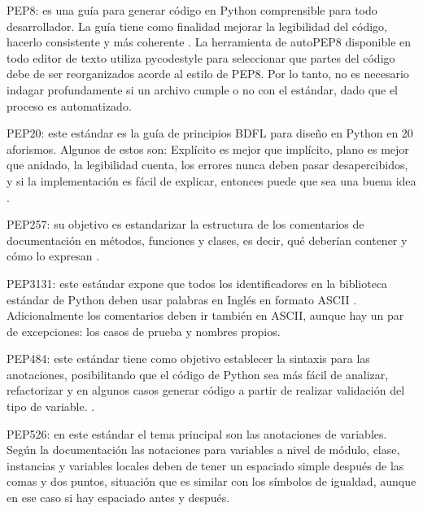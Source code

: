 \begin{APAitemize}
    \item PEP8: es una guía para generar código en Python comprensible para todo desarrollador. La guía tiene como finalidad mejorar la legibilidad del código, hacerlo consistente y más coherente \parencite{PEP8Python}. La herramienta de autoPEP8 disponible en todo editor de texto utiliza pycodestyle para seleccionar que partes del código debe de ser reorganizados acorde al estilo de PEP8. Por lo tanto, no es necesario indagar profundamente si un archivo cumple o no con el estándar, dado que el proceso es automatizado. 
    \item PEP20: este estándar es la guía de principios BDFL para diseño en Python en 20 aforismos. Algunos de estos son: Explícito es mejor que implícito, plano es mejor que anidado, la legibilidad cuenta, los errores nunca deben pasar desapercibidos, y si la implementación es fácil de explicar, entonces puede que sea una buena idea \parencite{PEP20Python}. 
    \item PEP257: su objetivo es estandarizar la estructura de los comentarios de documentación en métodos, funciones y clases, es decir, qué deberían contener y cómo lo expresan \parencite{PEP257Python}.
    \item PEP3131: este estándar expone que todos los identificadores en la biblioteca estándar de Python deben usar palabras en Inglés en formato ASCII \parencite{PEP3131Python}. Adicionalmente los comentarios deben ir también en ASCII, aunque hay un par de excepciones: los casos de prueba y nombres propios.
    \item PEP484: este estándar tiene como objetivo establecer la sintaxis para las anotaciones, posibilitando que el código de Python sea más fácil de analizar, refactorizar y en algunos casos generar código a partir de realizar validación del tipo de variable. \parencite{PEP484Python}.
    \item PEP526: en este estándar el tema principal son las anotaciones de variables. Según la documentación \parencite{PEP526Python} las notaciones para variables a nivel de módulo, clase, instancias y variables locales deben de tener un espaciado simple después de las comas y dos puntos, situación que es similar con los símbolos de igualdad, aunque en ese caso si hay espaciado antes y después. 
\end{APAitemize}

